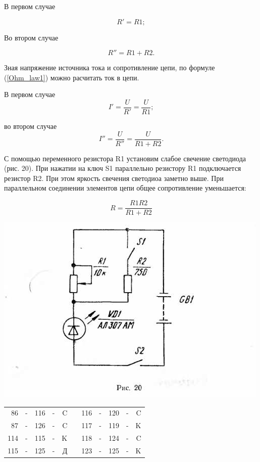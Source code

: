 \documentclass[12pt]{article}
\begin{document}
В первом случае

$$ R' = R1; $$

Во втором случае

$$ R'' = R1 + R2. $$

Зная напряжение источника тока и сопротивление цепи, по формуле (\ref{Ohm_law1}) можно расчитать ток в цепи.

В первом случае $$ I' = \frac{U}{R'} = \frac{U}{R1}; $$

во втором случае $$ I'' = \frac{U}{R''} = \frac{U}{R1+R2}. $$


\newpage

С помощью переменного резистора R1 установим слабое свечение светодиода (рис. 20). При нажатии на ключ S1 параллельно резистору R1 подключается резистор R2. При этом яркость свечения светодиоа заметно выше. При параллельном соединении элементов цепи общее сопротивление уменьшается:

\begin{equation}
R = \frac{R1 R2}{R1 + R2}
\label{Ohm_parallel}
\end{equation}

\includegraphics[scale=0.9]{ekon3_017_1}

\hspace{1cm}\begin{tabular}{rcrcrp{3cm}rcrcr}
86   & - & 116 & - & C &   & 116 & - & 120 & - & C\\
87   & - & 126 & - & C &   & 117 & - & 119 & - & K\\
114  & - & 115 & - & K &   & 118 & - & 124 & - & C\\
115  & - & 125 & - & Д &   & 123 & - & 125 & - & K\\
\end{tabular}
\end{document}
